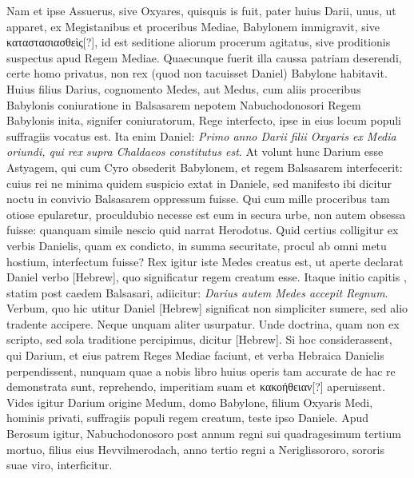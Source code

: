 Nam et ipse Assuerus,
sive Oxyares, quisquis is fuit, pater huius Darii, unus, ut apparet,
ex Megistanibus et proceribus Mediae, Babylonem immigravit,
sive \textgreek{καταστασιασθεὶς[?]}, id est seditione aliorum procerum agitatus,
sive proditionis suspectus apud Regem Mediae.
Quaecunque fuerit
illa caussa patriam deserendi, certe homo privatus, non rex
(quod non tacuisset Daniel) Babylone habitavit.
Huius filius Darius,
cognomento Medes, aut Medus, cum aliis proceribus Babylonis
coniuratione in Balsasarem nepotem Nabuchodonosori Regem
Babylonis inita, signifer coniuratorum, Rege interfecto, ipse
in eius locum populi suffragiis vocatus est.
Ita enim Daniel: \textit{Primo
anno Darii filii Oxyaris ex Media oriundi, qui rex supra Chaldaeos
constitutus est}.
At volunt hunc Darium esse Astyagem, qui cum
Cyro obsederit Babylonem, et regem Balsasarem interfecerit: cuius
rei ne minima quidem suspicio extat in Daniele, sed manifesto
ibi dicitur noctu in convivio Balsasarem oppressum fuisse.
Qui
cum mille proceribus tam otiose epularetur, proculdubio necesse
est eum in secura urbe, non autem obsessa fuisse: quanquam simile
nescio quid narrat Herodotus.
Quid certius colligitur ex verbis
Danielis, quam ex condicto, in summa securitate, procul ab omni
metu hostium, interfectum fuisse?
Rex igitur iste Medes creatus
est, ut aperte declarat Daniel verbo
 \texthebrew{[Hebrew]}, quo significatur regem
creatum esse.
Itaque initio capitis , statim post caedem Balsasari,
adiicitur: \textit{Darius autem Medes accepit Regnum}.
Verbum,
quo hic utitur Daniel \texthebrew{[Hebrew]}
 significat non simpliciter sumere, sed
alio tradente accipere.
Neque unquam aliter usurpatur.
Unde doctrina,
quam non ex scripto, sed sola traditione percipimus, dicitur
\texthebrew{[Hebrew]}.
Si hoc considerassent, qui Darium, et eius patrem Reges
Mediae faciunt, et verba Hebraica Danielis perpendissent,
nunquam quae a nobis libro  huius operis tam accurate de hac
re demonstrata sunt, reprehendo, imperitiam suam et \textgreek{κακοήθειαν[?]}
aperuissent.
Vides igitur Darium origine Medum, domo Babylone,
filium Oxyaris Medi, hominis privati, suffragiis populi regem
creatum, teste ipso Daniele.
Apud Berosum igitur, Nabuchodonosoro
post annum regni sui quadragesimum tertium mortuo, filius
eius Hevvilmerodach, anno tertio regni a Neriglissororo, sororis
suae viro, interficitur.

